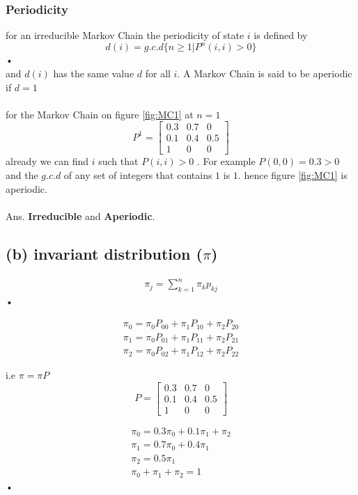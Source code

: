 \documentclass[a4paper,11pt]{report}
\begin{document}
\subsubsection*{Periodicity}
for an irreducible Markov Chain the periodicity of state $i$ is defined by
\begin{equation}
d(i)= g.c.d\{n\geq 1 | P^n(i,i)>0\}
\end{equation}•\\
and $d(i)$ has the same value $d$ for all $i$. A Markov Chain is said to be aperiodic if $d=1$ \cite{text}\\\\
for the Markov Chain on figure \ref{fig:MC1} at $n = 1$
$$
P^1=\begin{bmatrix} 
0.3 & 0.7 & 0 \\
0.1 & 0.4 & 0.5\\
1    & 0     &0
\end{bmatrix}
$$
already we can find $ i$ such that $P(i,i)>0$ . For example $P(0,0)=0.3>0$ and the $ g.c.d $ of any set of integers that contains $1$ is $1$.
hence figure \ref{fig:MC1} is aperiodic.\\\\
Ans.
\textbf{Irreducible} and \textbf{Aperiodic}. 

\subsection*{(b) invariant distribution ($\pi$) }

\begin{eqnarray}
\pi_j = \sum_{k=1}^{n} \pi_k p_{kj}
\end{eqnarray}•

\begin{eqnarray}
\pi_0 = \pi_0 P_{00} + \pi_1 P_{10} + \pi_2 P_{20}\\
\pi_1 = \pi_0 P_{01} + \pi_1 P_{11} + \pi_2 P_{21}\\
\pi_2 = \pi_0 P_{02} + \pi_1 P_{12} + \pi_2 P_{22}
\end{eqnarray}

i.e $\pi = \pi P$\\

$$
P=\begin{bmatrix} 
0.3 & 0.7 & 0 \\
0.1 & 0.4 & 0.5\\
1    & 0     &0
\end{bmatrix}
$$


\begin{eqnarray}
\pi_0 = 0.3\pi_0+ 0.1\pi_1 + \pi_2 \\
\pi_1 = 0.7\pi_0+ 0.4\pi_1  \\
\pi_2 = 0.5\pi_1\\ 
\pi_0+\pi_1+\pi_2 = 1
\end{eqnarray}•
\end{document}
